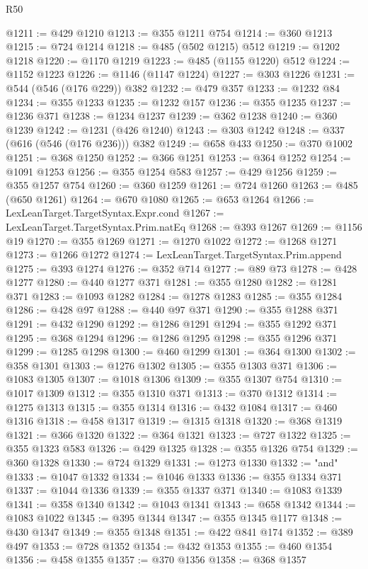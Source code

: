 \begin{lexlean}{R50}
\begin{coremodule}
@1211 := @429 @1210
@1213 := @355 @1211 @754
@1214 := @360 @1213
@1215 := @724 @1214
@1218 := @485 (@502 @1215) @512
@1219 := @1202 @1218
@1220 := @1170 @1219
@1223 := @485 (@1155 @1220) @512
@1224 := @1152 @1223
@1226 := @1146 (@1147 @1224)
@1227 := @303 @1226
@1231 := @544 (@546 (@176 @229)) @382
@1232 := @479 @357
@1233 := @1232 @84
@1234 := @355 @1233
@1235 := @1232 @157
@1236 := @355 @1235
@1237 := @1236 @371
@1238 := @1234 @1237
@1239 := @362 @1238
@1240 := @360 @1239
@1242 := @1231 (@426 @1240)
@1243 := @303 @1242
@1248 := @337 (@616 (@546 (@176 @236))) @382
@1249 := @658 @433
@1250 := @370 @1002
@1251 := @368 @1250
@1252 := @366 @1251
@1253 := @364 @1252
@1254 := @1091 @1253
@1256 := @355 @1254 @583
@1257 := @429 @1256
@1259 := @355 @1257 @754
@1260 := @360 @1259
@1261 := @724 @1260
@1263 := @485 (@650 @1261)
@1264 := @670 @1080
@1265 := @653 @1264
@1266 := LexLeanTarget.TargetSyntax.Expr.cond
@1267 := LexLeanTarget.TargetSyntax.Prim.natEq
@1268 := @393 @1267
@1269 := @1156 @19
@1270 := @355 @1269
@1271 := @1270 @1022
@1272 := @1268 @1271
@1273 := @1266 @1272
@1274 := LexLeanTarget.TargetSyntax.Prim.append
@1275 := @393 @1274
@1276 := @352 @714
@1277 := @89 @73
@1278 := @428 @1277
@1280 := @440 @1277 @371
@1281 := @355 @1280
@1282 := @1281 @371
@1283 := @1093 @1282
@1284 := @1278 @1283
@1285 := @355 @1284
@1286 := @428 @97
@1288 := @440 @97 @371
@1290 := @355 @1288 @371
@1291 := @432 @1290
@1292 := @1286 @1291
@1294 := @355 @1292 @371
@1295 := @368 @1294
@1296 := @1286 @1295
@1298 := @355 @1296 @371
@1299 := @1285 @1298
@1300 := @460 @1299
@1301 := @364 @1300
@1302 := @358 @1301
@1303 := @1276 @1302
@1305 := @355 @1303 @371
@1306 := @1083 @1305
@1307 := @1018 @1306
@1309 := @355 @1307 @754
@1310 := @1017 @1309
@1312 := @355 @1310 @371
@1313 := @370 @1312
@1314 := @1275 @1313
@1315 := @355 @1314
@1316 := @432 @1084
@1317 := @460 @1316
@1318 := @458 @1317
@1319 := @1315 @1318
@1320 := @368 @1319
@1321 := @366 @1320
@1322 := @364 @1321
@1323 := @727 @1322
@1325 := @355 @1323 @583
@1326 := @429 @1325
@1328 := @355 @1326 @754
@1329 := @360 @1328
@1330 := @724 @1329
@1331 := @1273 @1330
@1332 := "and"
@1333 := @1047 @1332
@1334 := @1046 @1333
@1336 := @355 @1334 @371
@1337 := @1044 @1336
@1339 := @355 @1337 @371
@1340 := @1083 @1339
@1341 := @358 @1340
@1342 := @1043 @1341
@1343 := @658 @1342
@1344 := @1083 @1022
@1345 := @395 @1344
@1347 := @355 @1345 @1177
@1348 := @430 @1347
@1349 := @355 @1348
@1351 := @422 @841 @174
@1352 := @389 @497
@1353 := @728 @1352
@1354 := @432 @1353
@1355 := @460 @1354
@1356 := @458 @1355
@1357 := @370 @1356
@1358 := @368 @1357

\end{coremodule}
\end{lexlean}
